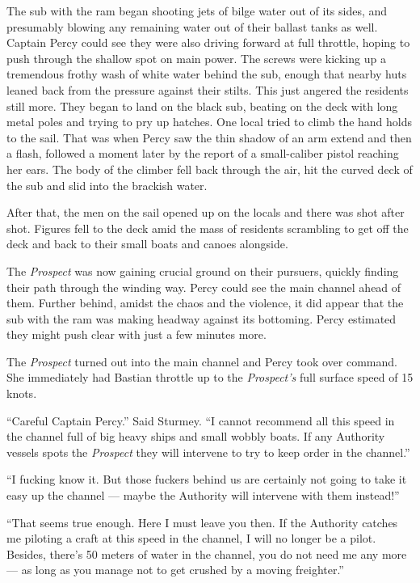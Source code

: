 \documentclass[
]{scrbook}
\begin{document}
The sub with the ram began shooting jets of bilge water out of its
sides, and presumably blowing any remaining water out of their ballast
tanks as well. Captain Percy could see they were also driving forward at
full throttle, hoping to push through the shallow spot on main power.
The screws were kicking up a tremendous frothy wash of white water
behind the sub, enough that nearby huts leaned back from the pressure
against their stilts. This just angered the residents still more. They
began to land on the black sub, beating on the deck with long metal
poles and trying to pry up hatches. One local tried to climb the hand
holds to the sail. That was when Percy saw the thin shadow of an arm
extend and then a flash, followed a moment later by the report of a
small-caliber pistol reaching her ears. The body of the climber fell
back through the air, hit the curved deck of the sub and slid into the
brackish water.

After that, the men on the sail opened up on the locals and there was
shot after shot. Figures fell to the deck amid the mass of residents
scrambling to get off the deck and back to their small boats and canoes
alongside.

The \emph{Prospect} was now gaining crucial ground on their pursuers,
quickly finding their path through the winding way. Percy could see the
main channel ahead of them. Further behind, amidst the chaos and the
violence, it did appear that the sub with the ram was making headway
against its bottoming. Percy estimated they might push clear with just a
few minutes more.

The \emph{Prospect} turned out into the main channel and Percy took over
command. She immediately had Bastian throttle up to the
\emph{Prospect's} full surface speed of 15 knots.

``Careful Captain Percy.'' Said Sturmey. ``I cannot recommend all this
speed in the channel full of big heavy ships and small wobbly boats. If
any Authority vessels spots the \emph{Prospect} they will intervene to
try to keep order in the channel.''

``I fucking know it. But those fuckers behind us are certainly not going
to take it easy up the channel --- maybe the Authority will intervene
with them instead!''

``That seems true enough. Here I must leave you then. If the Authority
catches me piloting a craft at this speed in the channel, I will no
longer be a pilot. Besides, there's 50 meters of water in the channel,
you do not need me any more --- as long as you manage not to get crushed
by a moving freighter.''
\end{document}
